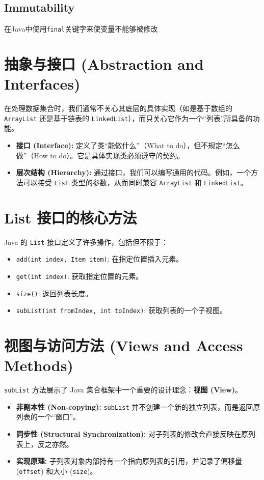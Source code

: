 \documentclass[12pt, a4paper, openany]{ctexbook} %
\begin{document}
\subsection{Immutability}
在Java中使用\texttt{final}关键字来使变量不能够被修改

\section{抽象与接口 (Abstraction and Interfaces)}
在处理数据集合时，我们通常不关心其底层的具体实现（如是基于数组的 \texttt{ArrayList} 还是基于链表的 \texttt{LinkedList}），而只关心它作为一个“列表”所具备的功能。

\begin{itemize}
    \item \textbf{接口 (Interface):} 定义了类“能做什么”（What to do），但不规定“怎么做”（How to do）。它是具体实现类必须遵守的契约。
    \item \textbf{层次结构 (Hierarchy):} 通过接口，我们可以编写通用的代码。例如，一个方法可以接受 \texttt{List} 类型的参数，从而同时兼容 \texttt{ArrayList} 和 \texttt{LinkedList}。
\end{itemize}

\section{List 接口的核心方法}
Java 的 \texttt{List} 接口定义了许多操作，包括但不限于：
\begin{itemize}
    \item \texttt{add(int index, Item item)}: 在指定位置插入元素。
    \item \texttt{get(int index)}: 获取指定位置的元素。
    \item \texttt{size()}: 返回列表长度。
    \item \texttt{subList(int fromIndex, int toIndex)}: 获取列表的一个子视图。
\end{itemize}

\section{视图与访问方法 (Views and Access Methods)}
\texttt{subList} 方法展示了 Java 集合框架中一个重要的设计理念：\textbf{视图 (View)}。

\begin{itemize}
    \item \textbf{非副本性 (Non-copying):} \texttt{subList} 并不创建一个新的独立列表，而是返回原列表的一个“窗口”。
    \item \textbf{同步性 (Structural Synchronization):} 对子列表的修改会直接反映在原列表上，反之亦然。
    \item \textbf{实现原理:} 子列表对象内部持有一个指向原列表的引用，并记录了偏移量 (\texttt{offset}) 和大小 (\texttt{size})。
\end{itemize}
\end{document}
